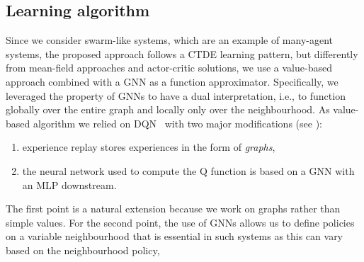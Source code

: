 \documentclass[conference]{IEEEtran}
\begin{document}
\subsection{Learning algorithm}
Since we consider swarm-like systems, which are an example of many-agent systems, 
 the proposed approach follows a \ac{CTDE} learning pattern,
 but differently from mean-field approaches and actor-critic solutions,
 we use a value-based approach combined with a \ac{GNN} as a function approximator.
%
%
Specifically, we leveraged the property of \ac{GNN}s to have a dual interpretation, i.e., to function globally over the entire graph and locally only over the neighbourhood. 
%
As value-based algorithm we relied on \ac{DQN}~\cite{mnih2015playing}  with two major modifications (see ): 
\begin{enumerate}
  \item experience replay stores experiences in the form of \emph{graphs},
  \item the neural network used to compute the Q function is based on a \ac{GNN} with an \ac{MLP} downstream.
\end{enumerate}
The first point is a natural extension because we work on graphs rather than simple values. 
%
For the second point,
 the use of \acp{GNN} allows us to define policies on a variable neighbourhood  that is essential in such systems as this can vary based on the neighbourhood policy,
\end{document}
